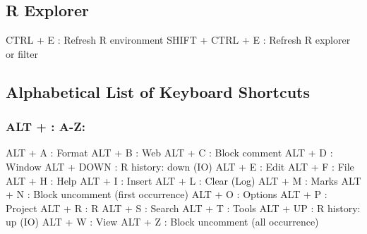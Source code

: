 \newpage
\hypertarget{basic_card_rexplorer}{}
\subsection{R Explorer}

\vspace{-0.5cm}
\begin{Rtables}[caption={[R explorer keyboard shortcuts]
    R explorer keyboard shortcuts},
  label=shortcut:rexplorer]
  CTRL  + E               : Refresh R environment
  SHIFT + CTRL + E        : Refresh R explorer or filter
\end{Rtables}


\hypertarget{basic_card_alphabetical}{}
\subsection{Alphabetical List of Keyboard Shortcuts}


\subsubsection{ALT + : A-Z:}

\vspace{-0.5cm}
\begin{Rtables}[caption={[ALT keyboard shortcuts]
    ALT Keyboard Shortcuts},
  label=shortcut:alt]
  ALT + A                 : Format
  ALT + B                 : Web
  ALT + C                 : Block comment
  ALT + D                 : Window
  ALT + DOWN              : R history: down (IO)
  ALT + E                 : Edit
  ALT + F                 : File
  ALT + H                 : Help
  ALT + I                 : Insert
  ALT + L                 : Clear (Log)
  ALT + M                 : Marks
  ALT + N                 : Block uncomment (first occurrence)
  ALT + O                 : Options
  ALT + P                 : Project
  ALT + R                 : R
  ALT + S                 : Search
  ALT + T                 : Tools
  ALT + UP                : R history: up (IO)
  ALT + W                 : View
  ALT + Z                 : Block uncomment (all occurrence)
\end{Rtables}


